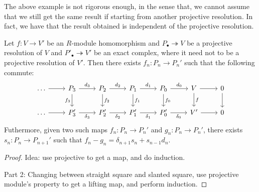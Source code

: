 \medskip

\begin{re}
    The above example is not rigorous enough, in the sense that, we cannot assume that we still get the same result if starting from another projective resolution. In fact, we have that the result obtained is independent of the projective resolution.
\end{re}

\medskip

\begin{pro} 
    Let $f:V\to V'$ be an $R$-module homomorphism and $P_\bullet\twoheadrightarrow V$ be a projective resolution of $V$ and $P'_\bullet \twoheadrightarrow V'$ be an exact complex, where it need not to be a projective resolution of $V'$. Then there exists $f_n:P_n\to P_n'$ such that the following commute:
    \[\begin{tikzcd}[sep=small]
	{\dots } && {P_3} && {P_2} && {P_1} && {P_0} && V && 0 \\
	\\
	\dots && {P_3'} && {P'_2} && {P'_1} && {P'_0} && {V'} && 0
	\arrow[from=1-1, to=1-3]
	\arrow["{d_3}", from=1-3, to=1-5]
	\arrow["{f_3}"', from=1-3, to=3-3]
	\arrow["{d_2}", from=1-5, to=1-7]
	\arrow["{f_2}", from=1-5, to=3-5]
	\arrow["{d_1}", from=1-7, to=1-9]
	\arrow["{f_1}", from=1-7, to=3-7]
	\arrow["{d_0}", from=1-9, to=1-11]
	\arrow["{f_0}", from=1-9, to=3-9]
	\arrow[from=1-11, to=1-13]
	\arrow["f", from=1-11, to=3-11]
	\arrow[from=1-13, to=3-13]
	\arrow[from=3-1, to=3-3]
	\arrow["{\delta_3}"', from=3-3, to=3-5]
	\arrow["{\delta_2}"', from=3-5, to=3-7]
	\arrow["{\delta_1}"', from=3-7, to=3-9]
	\arrow["{\delta_0}"', from=3-9, to=3-11]
	\arrow[from=3-11, to=3-13]
\end{tikzcd}\]
    Futhermore, given two such maps $f_n:P_n \to P_n'$ and $g_n:P_n\to P_n'$, there exists $s_n:P_n \to P_{n+1}'$ such that $f_n-g_n=\delta_{n+1}s_n + s_{n-1}d_n$.
\end{pro}
\begin{proof}
    Idea: use projective to get a map, and do induction.

    Part 2: Changing between straight square and slanted square, use projective module's property to get a lifting map, and perform induction.

\end{proof}

